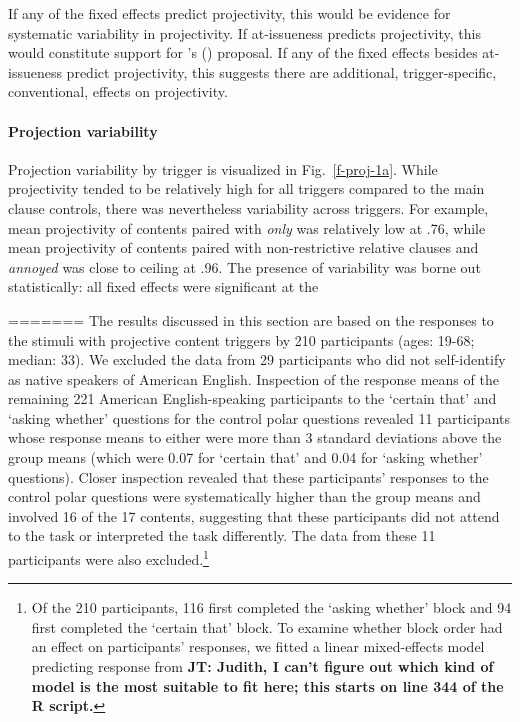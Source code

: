 \documentclass[11pt,fleqn]{article}
\newcommand{\6}{\mbox{$[\hspace*{-.6mm}[$}}
\newcommand{\9}{\mbox{$]\hspace*{-.6mm}]$}}
\newcommand{\citetpos}[1]{\citeauthor{#1}'s (\citeyear{#1})}
\newcommand{\figref}[1]{Fig.~\ref{#1}}
\newcommand{\jt}[1]{\textbf{\color{blue}JT: #1}}
\begin{document}
If any of the fixed effects predict projectivity, this would be evidence for systematic variability in projectivity. If at-issueness predicts projectivity, this would constitute support for \citetpos{brst-salt10} proposal. If any of the fixed effects besides at-issueness predict projectivity, this suggests there are additional, trigger-specific, conventional, effects on projectivity. 


\paragraph{Projection variability} Projection variability by trigger is visualized in \figref{f-proj-1a}. While projectivity tended to be relatively high for all triggers compared to the main clause controls, there was nevertheless variability across triggers. For example, mean projectivity of contents paired with \emph{only} was relatively low at .76, while mean projectivity of contents paired with non-restrictive relative clauses and \emph{annoyed} was close to ceiling at .96. The presence of variability was borne out statistically: all fixed effects were significant at the 

=======
The results discussed in this section are based on the responses to the stimuli with projective content triggers by 210 participants (ages: 19-68; median: 33).  We excluded the data from 29 participants who did not self-identify as native speakers of American English. Inspection of the response means of the remaining 221 American English-speaking participants to the `certain that' and `asking whether' questions for the control polar questions revealed 11 participants whose response means to either were more than 3 standard deviations above the group means (which were 0.07 for `certain that' and 0.04 for `asking whether' questions). Closer inspection revealed that these participants' responses to the control polar questions were systematically higher than the group means and involved 16 of the 17 contents, suggesting that these participants did not attend to the task or interpreted the task differently. The data from these 11 participants were also excluded.\footnote{Of the 210 participants, 116 first completed the `asking whether' block and 94 first completed the `certain that' block. To examine whether block order had an effect on participants' responses, we fitted a linear mixed-effects model predicting response from \jt{Judith, I can't figure out which kind of model is the most suitable to fit here; this starts on line 344 of the R script.}}
\end{document}
